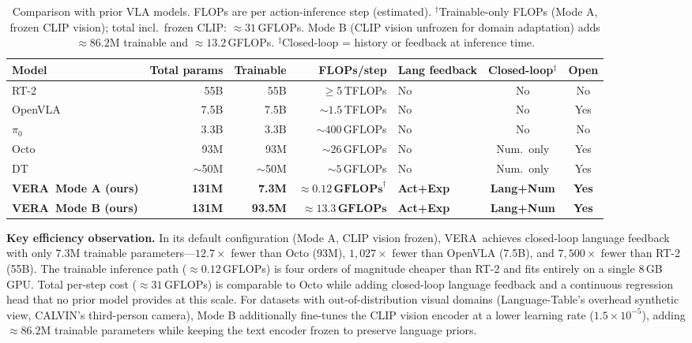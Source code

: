 \documentclass{article}
\newcommand{\modelname}{\textsc{VERA}\xspace}
\begin{document}
\begin{table}[h]
\centering
\caption{Comparison with prior VLA models.
  FLOPs are per action-inference step (estimated).
  $^\dagger$Trainable-only FLOPs (Mode A, frozen CLIP vision); total incl.\ frozen CLIP: ${\approx}31$\,GFLOPs.
  Mode B (CLIP vision unfrozen for domain adaptation) adds ${\approx}86.2$M trainable and ${\approx}13.2$\,GFLOPs.
  $^\ddagger$Closed-loop = history or feedback at inference time.}
\label{tab:comparison}
\small
\setlength{\tabcolsep}{4pt}
\begin{tabular}{lrrrlcc}
\toprule
\textbf{Model} & \textbf{Total params} & \textbf{Trainable} & \textbf{FLOPs/step}
               & \textbf{Lang feedback} & \textbf{Closed-loop$^\ddagger$} & \textbf{Open} \\
\midrule
RT-2~\citep{brohan2023rt2}     & 55B  & 55B   & $\ge$5\,TFLOPs   & No  & No          & No  \\
OpenVLA~\citep{kim2024openvla} & 7.5B & 7.5B  & ${\sim}1.5$\,TFLOPs & No & No        & Yes \\
$\pi_0$~\citep{black2024pi0}   & 3.3B & 3.3B  & ${\sim}400$\,GFLOPs & No & No        & No  \\
Octo~\citep{octo2024}          & 93M  & 93M   & ${\sim}26$\,GFLOPs  & No & Num.\ only & Yes \\
DT~\citep{chen2021decision}    & ${\sim}$50M & ${\sim}$50M & ${\sim}5$\,GFLOPs & No & Num.\ only & Yes \\
\midrule
\textbf{\modelname\ Mode A (ours)} & \textbf{131M} & \textbf{7.3M}
                               & $\mathbf{{\approx}0.12\,\text{GFLOPs}}^\dagger$
                               & \textbf{Act+Exp} & \textbf{Lang+Num} & \textbf{Yes} \\
\textbf{\modelname\ Mode B (ours)} & \textbf{131M} & \textbf{93.5M}
                               & $\mathbf{{\approx}13.3\,\text{GFLOPs}}$
                               & \textbf{Act+Exp} & \textbf{Lang+Num} & \textbf{Yes} \\
\bottomrule
\end{tabular}
\end{table}

\noindent\textbf{Key efficiency observation.}
In its default configuration (Mode A, CLIP vision frozen), \modelname\ achieves
closed-loop language feedback with only 7.3M trainable parameters---$12.7\times$
fewer than Octo (93M), $1{,}027\times$ fewer than OpenVLA (7.5B), and
$7{,}500\times$ fewer than RT-2 (55B).
The trainable inference path (${\approx}0.12$\,GFLOPs) is four orders of
magnitude cheaper than RT-2 and fits entirely on a single 8\,GB GPU.
Total per-step cost (${\approx}31$\,GFLOPs) is comparable to Octo while adding
closed-loop language feedback and a continuous regression head that no prior
model provides at this scale.
For datasets with out-of-distribution visual domains (Language-Table's
overhead synthetic view, CALVIN's third-person camera), Mode B additionally
fine-tunes the CLIP vision encoder at a lower learning rate ($1.5\!\times\!10^{-5}$),
adding ${\approx}86.2$M trainable parameters while keeping the text encoder frozen
to preserve language priors.
\end{document}

